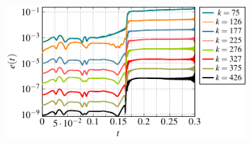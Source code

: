 \begin{figure}
\centering
\begin{subfigure}[]{0.48\linewidth}
        \includegraphics[scale=1]{Figures/paper-figure14.pdf}

\end{subfigure}
\end{figure}
